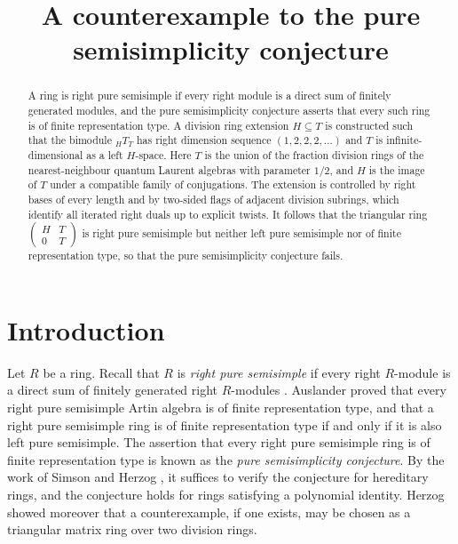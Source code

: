 \documentclass[11pt,a4paper]{amsart}
\title{A counterexample to the pure semisimplicity conjecture}
\date{}
\numberwithin{equation}{section}
\begin{document}
\begin{abstract}
A ring is right pure semisimple if every right module is a direct sum of finitely generated modules, and the pure semisimplicity conjecture asserts that every such ring is of finite representation type. A division ring extension $H\subseteq T$ is constructed such that the bimodule ${}_HT_T$ has right dimension sequence $(1,2,2,2,\dots)$ and $T$ is infinite-dimensional as a left $H$-space. Here $T$ is the union of the fraction division rings of the nearest-neighbour quantum Laurent algebras with parameter $1/2$, and $H$ is the image of $T$ under a compatible family of conjugations. The extension is controlled by right bases of every length and by two-sided flags of adjacent division subrings, which identify all iterated right duals up to explicit twists. It follows that the triangular ring $\left(\begin{smallmatrix}H&T\\0&T\end{smallmatrix}\right)$ is right pure semisimple but neither left pure semisimple nor of finite representation type, so that the pure semisimplicity conjecture fails.
\end{abstract}

\maketitle

\section{Introduction}

Let $R$ be a ring. Recall that $R$ is \emph{right pure semisimple} if every right $R$-module is a direct sum of finitely generated right $R$-modules \cite{Si77}. Auslander \cite{Au} proved that every right pure semisimple Artin algebra is of finite representation type, and that a right pure semisimple ring is of finite representation type if and only if it is also left pure semisimple. The assertion that every right pure semisimple ring is of finite representation type is known as the \emph{pure semisimplicity conjecture}. By the work of Simson \cite{Si81,Si83} and Herzog \cite{He}, it suffices to verify the conjecture for hereditary rings, and the conjecture holds for rings satisfying a polynomial identity. Herzog \cite{He} showed moreover that a counterexample, if one exists, may be chosen as a triangular matrix ring over two division rings.
\end{document}
